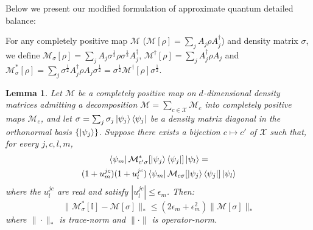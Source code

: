 \documentclass[aps,floatfix,10pt,amssymb,amsfont,amsmath,superscriptaddress,float,nofootinbib,longbibliography,nobalancelastpage,twocolumn]{revtex4-2}
\newtheorem{lemma}{Lemma}
\begin{document}
Below we present our modified formulation of approximate quantum detailed balance:

For any completely positive map $\mathcal{M}$ ($\mathcal{M}[\rho] =\sum_{j}  A_{j}\rho  A^{\dagger}_{j}$) and density matrix $\sigma$, we define $\mathcal{M}_{\sigma}[\rho] =\sum_{j}  A_{j}\sigma^{\frac{1}{2}}\rho\sigma^{\frac{1}{2}}  A^{\dagger}_{j}$, $\mathcal{M}^{\dagger}[\rho] = \sum_j A^{\dagger}_j \rho A_j$ and $ \mathcal{M}^*_{\sigma}[\rho] = \sum_{j} \sigma^{\frac{1}{2}}A^{\dagger}_{j}\rho A_{j}\sigma^{\frac{1}{2}} = \sigma^{\frac{1}{2}}\mathcal{M}^{\dagger}[\rho]\sigma^{\frac{1}{2}}$.
\begin{lemma}
\label{lemma:1}
Let $\mathcal{M}$ be a completely positive map on $d$-dimensional density matrices admitting a decomposition $\mathcal{M} = \sum_{c\in\mathcal{X}} \mathcal{M}_c$ into completely positive maps $\mathcal{M}_c$, and let $\sigma = \sum_j \sigma_j \ket{\psi_j}\bra{\psi_j}$ be a density matrix diagonal in the orthonormal basis $\{\ket{\psi_j}\}$. Suppose there exists a bijection $c \mapsto c'$ of $\mathcal{X}$ such that, for every $j,c,l,m$,
\begin{multline}
    \bra{\psi_m}\mathcal{M}^*_{c'\sigma}[\ket{\psi_j}\bra{\psi_j}]\ket{\psi_l}
    =\\(1+u^{jc}_m)(1+ u^{jc}_l)
    \bra{\psi_m}\mathcal{M}_{c\sigma}[\ket{\psi_j}\bra{\psi_j}]\ket{\psi_l}
    \label{eq:approximate_quantum_detailed_balance_condition}
\end{multline}
where the $u^{jc}_l$ are real and satisfy $|u^{jc}_l| \leq \epsilon_m$. Then:
 \begin{equation}
    \|\mathcal{M}^*_{\sigma}[\mathbb{I}]-\mathcal{M}[\sigma] \|_* \leq (2\epsilon_m+\epsilon_m^2)\|\mathcal{M}[\sigma]\|_* 
\end{equation}
where $\|\cdot\|_*$ is trace-norm and $\|\cdot\|$ is operator-norm.
\end{lemma}
\end{document}
